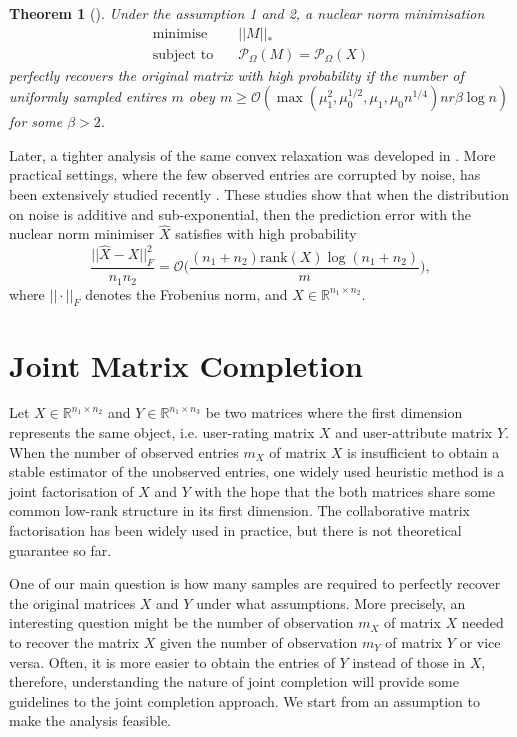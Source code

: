 \documentclass{article} %
\newtheorem{theorem}{Theorem}
\theoremstyle{definition}
\newcommand\mc{\mathcal} %
\begin{document}
\begin{theorem}[\cite{candes2009exact}]
Under the assumption 1 and 2, a nuclear norm minimisation
\begin{align}
\text{minimise}&\quad ||M||_* \\
\text{subject to}&\quad \mc{P}_{\Omega}(M) = \mc{P}_{\Omega}(X) 
\end{align}
perfectly recovers the original matrix with high probability if the number of uniformly sampled entires $m$ obey $m\geq \mathcal{O}(\max(\mu_1^2,\mu_0^{1/2},\mu_1,\mu_0n^{1/4}) n r \beta \log n)$ for some $\beta > 2$.
\end{theorem}
Later, a tighter analysis of the same convex relaxation was developed in \cite{candes2010power,recht2011simpler}. More practical settings, where the few observed entries are corrupted by noise, has been extensively studied recently \cite{candes2010matrix,keshavan2010matrix,negahban2012restricted,klopp2014noisy,lafond2015low}. These studies show that when the distribution on noise is additive and sub-exponential, then the prediction error with the nuclear norm minimiser $\hat{X}$ satisfies with high probability
\begin{equation}
\frac{||\hat{X} - X||^2_{F}}{n_1 n_2} = \mathcal{O}\bigg(
\frac{(n_1+n_2) \text{rank}(X) \log (n_1 + n_2)}{m}
\bigg),
\end{equation}
where $||\cdot||_F$ denotes the Frobenius norm, and $X\in\mathbb{R}^{n_1 \times n_2}$.

\section{Joint Matrix Completion}
Let $X \in \mathbb{R}^{n_1 \times n_2}$ and $Y \in \mathbb{R}^{n_1 \times n_3}$ be two matrices where the first dimension represents the same object, i.e. user-rating matrix $X$ and user-attribute matrix $Y$. When the number of observed entries $m_X$ of matrix $X$ is insufficient to obtain a stable estimator of the unobserved entries, one widely used heuristic method is a joint factorisation of $X$ and $Y$ with the hope that the both matrices share some common low-rank structure in its first dimension. The collaborative matrix factorisation has been widely used in practice, but there is not theoretical guarantee so far.

One of our main question is how many samples are required to perfectly recover the original matrices $X$ and $Y$ under what assumptions. More precisely, an interesting question might be the number of observation $m_X$ of matrix $X$ needed to recover the matrix $X$ given the number of observation $m_Y$ of matrix $Y$ or vice versa. Often, it is more easier to obtain the entries of $Y$ instead of those in $X$, therefore, understanding the nature of joint completion will provide some guidelines to the joint completion approach. We start from an assumption to make the analysis feasible.
\end{document}

